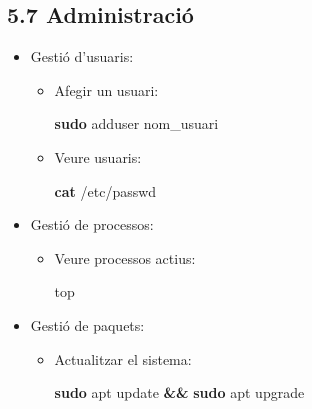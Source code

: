 \documentclass[
  a4paper,
]{article}
\newenvironment{Shaded}{\begin{snugshade}}{\end{snugshade}}
\newcommand{\ExtensionTok}[1]{#1}
\newcommand{\FunctionTok}[1]{\textcolor[rgb]{0.13,0.29,0.53}{\textbf{#1}}}
\newcommand{\KeywordTok}[1]{\textcolor[rgb]{0.13,0.29,0.53}{\textbf{#1}}}
\newcommand{\NormalTok}[1]{#1}
\providecommand{\tightlist}{%
  \setlength{\itemsep}{0pt}\setlength{\parskip}{0pt}}
\begin{document}
\subsection{5.7 Administració}\label{administraciuxf3}

\begin{itemize}
\tightlist
\item
  Gestió d'usuaris:

  \begin{itemize}
  \item
    Afegir un usuari:

\begin{Shaded}
\begin{Highlighting}[]
\FunctionTok{sudo}\NormalTok{ adduser nom\_usuari}
\end{Highlighting}
\end{Shaded}
  \item
    Veure usuaris:

\begin{Shaded}
\begin{Highlighting}[]
\FunctionTok{cat}\NormalTok{ /etc/passwd}
\end{Highlighting}
\end{Shaded}
  \end{itemize}
\item
  Gestió de processos:

  \begin{itemize}
  \item
    Veure processos actius:

\begin{Shaded}
\begin{Highlighting}[]
\ExtensionTok{top}
\end{Highlighting}
\end{Shaded}
  \end{itemize}
\item
  Gestió de paquets:

  \begin{itemize}
  \item
    Actualitzar el sistema:

\begin{Shaded}
\begin{Highlighting}[]
\FunctionTok{sudo}\NormalTok{ apt update }\KeywordTok{\&\&} \FunctionTok{sudo}\NormalTok{ apt upgrade}
\end{Highlighting}
\end{Shaded}
  \end{itemize}
\end{itemize}
\end{document}
